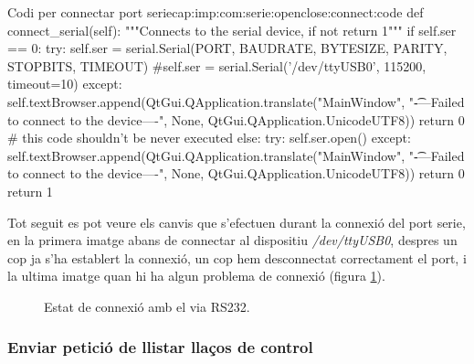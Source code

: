 \begin{code_python}{Codi per connectar port serie}{cap:imp:com:serie:openclose:connect:code}
def connect_serial(self):
        """Connects to the serial device, if not return 1"""
        if self.ser == 0:
            try:
                self.ser = serial.Serial(PORT, BAUDRATE, BYTESIZE, PARITY, STOPBITS, TIMEOUT)
                #self.ser = serial.Serial('/dev/ttyUSB0', 115200, timeout=10)
            except:
                self.textBrowser.append(QtGui.QApplication.translate("MainWindow", "\n\t----Failed to connect to the device----\n", None, QtGui.QApplication.UnicodeUTF8))
                return 0
        # this code shouldn't be never executed
        else:
            try:
                self.ser.open()
            except:
                self.textBrowser.append(QtGui.QApplication.translate("MainWindow", "\n\t----Failed to connect to the device----\n", None, QtGui.QApplication.UnicodeUTF8))
                return 0
        return 1
\end{code_python}

Tot seguit es pot veure els canvis que s'efectuen durant la connexió del port serie, en la primera imatge abans de connectar al dispositiu \emph{/dev/ttyUSB0}, despres un cop ja s'ha establert la connexió, un cop hem desconnectat correctament el port, i la ultima imatge quan hi ha algun problema de connexió (figura \ref{fig:comparacio:barra}).

\begin{figure}[ht!]
	\caption{Estat de connexió amb el \Supervisor via RS232.}
    \label{fig:comparacio:barra}
\end{figure}

\FloatBarrier

\subsubsection{Enviar petició de llistar llaços de control}\label{cap:imp:com:serie:send:devices}

